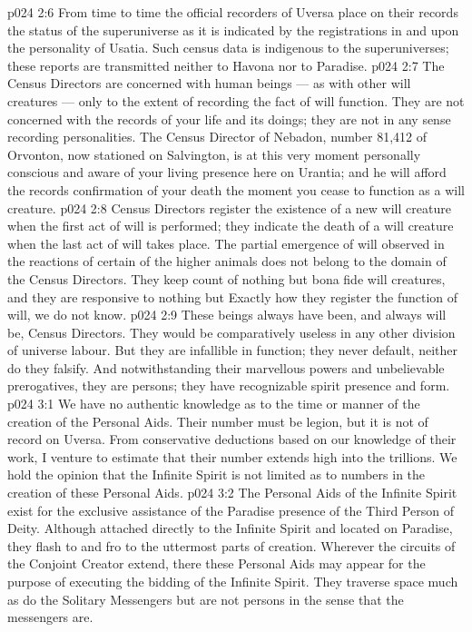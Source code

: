 \vs p024 2:6 From time to time the official recorders of Uversa place on their records the status of the superuniverse as it is indicated by the registrations in and upon the personality of Usatia. Such census data is indigenous to the superuniverses; these reports are transmitted neither to Havona nor to Paradise.
\vs p024 2:7 \pc The Census Directors are concerned with human beings --- as with other will creatures --- only to the extent of recording the fact of will function. They are not concerned with the records of your life and its doings; they are not in any sense recording personalities. The Census Director of Nebadon, number 81,412 of Orvonton, now stationed on Salvington, is at this very moment personally conscious and aware of your living presence here on Urantia; and he will afford the records confirmation of your death the moment you cease to function as a will creature.
\vs p024 2:8 Census Directors register the existence of a new will creature when the first act of will is performed; they indicate the death of a will creature when the last act of will takes place. The partial emergence of will observed in the reactions of certain of the higher animals does not belong to the domain of the Census Directors. They keep count of nothing but bona fide will creatures, and they are responsive to nothing but  Exactly how they register the function of will, we do not know.
\vs p024 2:9 These beings always have been, and always will be, Census Directors. They would be comparatively useless in any other division of universe labour. But they are infallible in function; they never default, neither do they falsify. And notwithstanding their marvellous powers and unbelievable prerogatives, they are persons; they have recognizable spirit presence and form.
\vs p024 3:1 We have no authentic knowledge as to the time or manner of the creation of the Personal Aids. Their number must be legion, but it is not of record on Uversa. From conservative deductions based on our knowledge of their work, I venture to estimate that their number extends high into the trillions. We hold the opinion that the Infinite Spirit is not limited as to numbers in the creation of these Personal Aids.
\vs p024 3:2 The Personal Aids of the Infinite Spirit exist for the exclusive assistance of the Paradise presence of the Third Person of Deity. Although attached directly to the Infinite Spirit and located on Paradise, they flash to and fro to the uttermost parts of creation. Wherever the circuits of the Conjoint Creator extend, there these Personal Aids may appear for the purpose of executing the bidding of the Infinite Spirit. They traverse space much as do the Solitary Messengers but are not persons in the sense that the messengers are.
